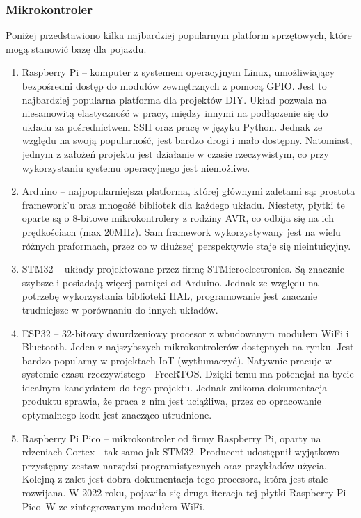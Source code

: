         \subsubsection{Mikrokontroler}
            Poniżej przedstawiono kilka najbardziej popularnym platform sprzętowych, które mogą stanowić bazę dla pojazdu.
            \begin{enumerate}
                \item Raspberry Pi -- komputer z systemem operacyjnym Linux, umożliwiający bezpośredni dostęp do modułów zewnętrznych z pomocą GPIO.
                Jest to najbardziej popularna platforma dla projektów DIY.
                Układ pozwala na niesamowitą elastyczność w pracy, między innymi na podłączenie się do układu za pośrednictwem SSH oraz pracę w języku Python.
                Jednak ze względu na swoją popularność, jest bardzo drogi i mało dostępny.
                Natomiast, jednym z założeń projektu jest działanie w czasie rzeczywistym, co przy wykorzystaniu systemu operacyjnego jest niemożliwe.
                \item Arduino -- najpopularniejsza platforma, której głównymi zaletami są: prostota framework'u oraz mnogość bibliotek dla każdego układu.
                Niestety, płytki te oparte są o 8-bitowe mikrokontrolery z rodziny AVR, co odbija się na ich prędkościach  (max 20MHz).
                Sam framework wykorzystywany jest na wielu różnych praformach, przez co w dłuższej perspektywie staje się nieintuicyjny.
                \item STM32 -- układy projektowane przez firmę STMicroelectronics. Są znacznie szybsze i posiadają więcej pamięci od Arduino.
                Jednak ze względu na potrzebę wykorzystania biblioteki HAL, programowanie jest znacznie trudniejsze w porównaniu do innych układów.
                \item ESP32 -- 32-bitowy dwurdzeniowy procesor z wbudowanym modułem WiFi i Bluetooth.
                Jeden z najszybszych mikrokontrolerów dostępnych na rynku. Jest bardzo popularny w projektach IoT (wytłumaczyć).
                Natywnie pracuje w systemie czasu rzeczywistego - FreeRTOS. Dzięki temu ma potencjał na bycie idealnym kandydatem do tego projektu.
                Jednak znikoma dokumentacja produktu sprawia, że praca z nim jest uciążliwa, przez co opracowanie optymalnego kodu jest znacząco utrudnione.
                \item Raspberry Pi Pico -- mikrokontroler od firmy Raspberry Pi, oparty na rdzeniach Cortex - tak samo jak STM32.
                Producent udostępnił wyjątkowo przystępny zestaw narzędzi programistycznych oraz przykładów użycia.
                Kolejną z zalet jest dobra dokumentacja tego procesora, która jest stale rozwijana.
                W 2022 roku, pojawiła się druga iteracja tej płytki Raspberry Pi Pico~W ze zintegrowanym modułem WiFi.
            \end{enumerate}
